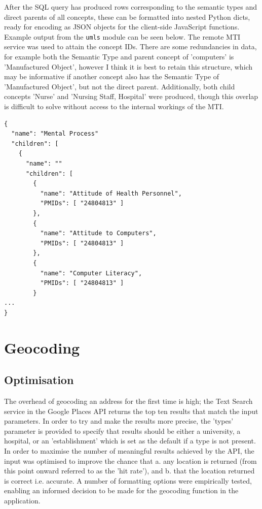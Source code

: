 \documentclass[Report.tex]{subfiles}
\begin{document}
\noindent After the SQL query has produced rows corresponding to the semantic types and direct parents of all concepts, these can be formatted into nested Python dicts, ready for encoding as JSON objects for the client-side JavaScript functions. Example output from the \texttt{umls} module can be seen below. The remote MTI service was used to attain the concept IDs. There are some redundancies in data, for example both the Semantic Type and parent concept of 'computers' is 'Manufactured Object', however I think it is best to retain this structure, which may be informative if another concept also has the Semantic Type of 'Manufactured Object', but not the direct parent. Additionally, both child concepts 'Nurse' and 'Nursing Staff, Hospital' were produced, though this overlap is difficult to solve without access to the internal workings of the MTI.\newpage

\begin{verbatim}
{
  "name": "Mental Process"
  "children": [
    {
      "name": ""
      "children": [
        {
          "name": "Attitude of Health Personnel",
          "PMIDs": [ "24804813" ]
        },
        {
          "name": "Attitude to Computers",
          "PMIDs": [ "24804813" ]
        },
        {
          "name": "Computer Literacy",
          "PMIDs": [ "24804813" ]
        }
...
}
\end{verbatim}

\section{Geocoding}
\subsection{Optimisation}
The overhead of geocoding an address for the first time is high; the Text Search service in the Google Places API returns the top ten results that match the input parameters. In order to try and make the results more precise, the 'types' parameter is provided to specify that results should be either a university, a hospital, or an 'establishment' which is set as the default if a type is not present. In order to maximise the number of meaningful results achieved by the API, the input was optimised to improve the chance that a. any location is returned (from this point onward referred to as the 'hit rate'), and b. that the location returned is correct i.e. accurate. A number of formatting options were empirically tested, enabling an informed decision to be made for the geocoding function in the application.\newline
\end{document}

